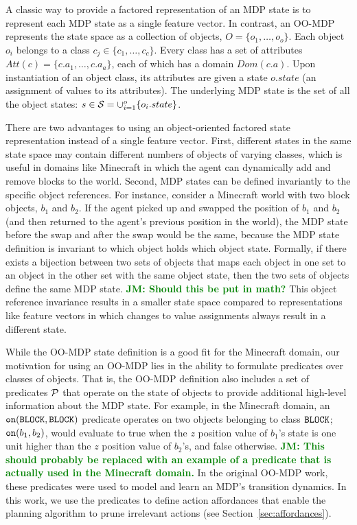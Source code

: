 \documentclass[]{article}
\newcommand{\jmnote}[1]{\textcolor{Green}{\textbf{JM: #1}}}
\begin{document}
A classic way to provide a factored representation of an MDP state is to represent
each MDP state as a single feature vector. In contrast, an OO-MDP represents the state space as a collection of objects,
$O = \{o_1, \ldots, o_o \}$.  Each object $o_i$ belongs to a
class $c_j \in  \{c_1, \ldots, c_c\}$. Every class has a set of attributes
$Att(c) = \{c.a_1, \ldots, c.a_a \}$, each of which has a domain $Dom(c.a)$.
Upon instantiation of an object class, its attributes are given a state $o.state$
(an assignment of values to its attributes).  The underlying MDP state is the set
of all the object states: $s \in {\cal S} = \cup_{i = 1}^o \{o_i.state\}$.

There are two advantages to using an object-oriented factored state representation instead 
of a single feature vector. First, different states in the same state space may contain
different numbers of objects of varying classes, which is useful in domains like Minecraft in which
the agent can dynamically add and remove blocks to the world. Second, MDP states can be defined invariantly to the specific object references.
For instance, consider a Minecraft world with two block objects, $b_1$ and $b_2$.
If the agent picked up and swapped the position of $b_1$ and $b_2$ (and then returned to the agent's
previous position in the world), the MDP state before the swap and after the swap would be the same,
because the MDP state definition is invariant to which object holds which object state.
Formally, if there exists a bijection between two sets of objects that maps each object
in one set to an object in the other set with the same object state, 
then the two sets of objects define the same
MDP state. \jmnote{Should this be put in math?}
This object reference invariance results in a smaller state space compared 
to representations like feature vectors in which changes to value assignments
always result in a different state.

While the OO-MDP state definition is a good fit for the
Minecraft domain, our motivation for using an OO-MDP lies in the
ability to formulate predicates over classes of objects. That is, the OO-MDP definition also includes
a set of predicates ${\cal P}$ that operate on the state of objects
to provide additional high-level information about the MDP state. For example,
in the Minecraft domain, an ${\tt on}({\tt BLOCK, BLOCK})$ predicate
operates on two objects belonging to class ${\tt BLOCK}$; ${\tt on}(b_1,b_2)$,
would evaluate to true when the $z$ position value of $b_1$'s state is one unit
higher than the $z$ position value of $b_2$'s, and false otherwise.
\jmnote{This should probably be replaced with an example of a predicate that is actually used in the Minecraft domain.}
In the original OO-MDP work, these 
predicates were used to model and learn an MDP's transition dynamics. In this work,
we use the predicates to define action affordances that enable the planning algorithm 
to prune irrelevant actions (see Section~\ref{sec:affordances}).
\end{document}
